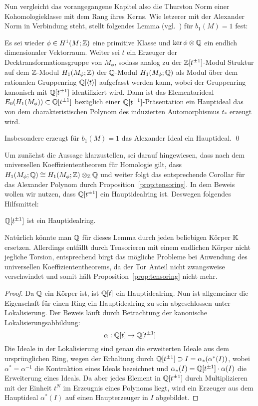Nun vergleicht das vorangegangene Kapitel also die Thurston Norm einer Kohomologieklasse mit dem Rang ihres Kerns. Wie letzerer mit der Alexander Norm in Verbindung steht, stellt folgendes Lemma (vgl.~\cite[Assertion~4]{Milnor.2009}) für $b_1(M)=1$ fest:
\begin{lem}
	\label{lem:charPol}
	Es sei wieder $\phi \in H^1(M;\mathbb{Z})$ eine primitive Klasse und $\ker \phi \otimes \mathbb{Q}$ ein endlich dimensionaler Vektorraum. Weiter sei $t$ ein Erzeuger der Decktransformationsgruppe von $M_\phi$, sodass analog zu der $\mathbb{Z}[t^{\pm 1}]$-Modul Struktur auf dem $\mathbb{Z}$-Modul $H_1(M_\phi;\mathbb{Z})$ der $\mathbb{Q}$-Modul $H_1(M_\phi;\mathbb{Q})$ als Modul über dem rationalen Gruppenring $\mathbb{Q}[\langle t \rangle]$ aufgefasst werden kann, wobei der Gruppenring kanonisch mit $\mathbb{Q}[t^{\pm 1}]$ identifiziert wird. Dann ist das Elementarideal $E_0(H_1(M_\phi))\subset \mathbb{Q}[t^{\pm1}]$ bezüglich einer $\mathbb{Q}[t^{\pm 1}]$-Präsentation ein Hauptideal das von dem charakteristischen Polynom des induzierten Automorphismus $t_*$ erzeugt wird.
\end{lem}
\begin{cor}
	Insbesondere erzeugt für $b_1(M)=1$ das Alexander Ideal ein Hauptideal. \qed
\end{cor}
Um zunächst die Aussage klarzustellen, sei darauf hingewiesen, dass nach dem universellen Koeffiziententheorem für Homologie gilt, dass $H_1(M_\phi;\mathbb{Q}) \cong H_1(M_\phi;\mathbb{Z})\otimes_{\mathbb{Z}} \mathbb{Q}$ und weiter folgt das entsprechende Corollar für das Alexander Polynom durch Proposition~\ref{prop:tensoring}.
In dem Beweis wollen wir nutzen, dass $\mathbb{Q}[t^{\pm 1}]$ ein Hauptidealring ist. Deswegen folgendes Hilfsmittel:
\begin{lem}
\label{lem:QThauptidealring}
	$\mathbb{Q}[t^{\pm 1}]$ ist ein Hauptidealring.
\end{lem}
Natürlich könnte man $\mathbb{Q}$ für dieses Lemma durch jeden beliebigen Körper $\mathbb{K}$ ersetzen. Allerdings entfällt durch Tensorieren mit einem endlichen Körper nicht jegliche Torsion, entsprechend birgt das mögliche Probleme bei Anwendung des universellen Koeffiziententheorems, da der $\operatorname{Tor}$ Anteil nicht zwangsweise verschwindet und somit hält Proposition~\ref{prop:tensoring} nicht mehr.
\begin{proof}
	Da $\mathbb{Q}$ ein Körper ist, ist $\mathbb{Q}[t]$ ein Hauptidealring. Nun ist allgemeiner die Eigenschaft für einen Ring ein Hauptidealring zu sein abgeschlossen unter Lokalisierung. Der Beweis läuft durch Betrachtung der kanonische Lokalisierungsabbildung:
	\[
		\alpha : \mathbb{Q}[t] \to \mathbb{Q}[t^{\pm 1}]
	\]
	Die Ideale in der Lokalisierung sind genau die erweiterten Ideale aus dem ursprünglichen Ring, wegen der Erhaltung durch $\mathbb{Q}[t^{\pm 1}] \supset I=\alpha_*(\alpha^*(I))$, wobei $\alpha^* = \alpha^{-1}$ die Kontraktion eines Ideals bezeichnet und $\alpha_*(I) = \mathbb{Q}[t^{\pm 1}] \cdot \alpha(I)$ die Erweiterung eines Ideals. Da aber jedes Element in $\mathbb{Q}[t^{\pm 1}]$ durch Multiplizieren mit der Einheit $t^N$ im Erzeugnis eines Polynoms liegt, wird ein Erzeuger aus dem Hauptideal $\alpha^*(I)$ auf einen Haupterzeuger in $I$ abgebildet. 
\end{proof}
